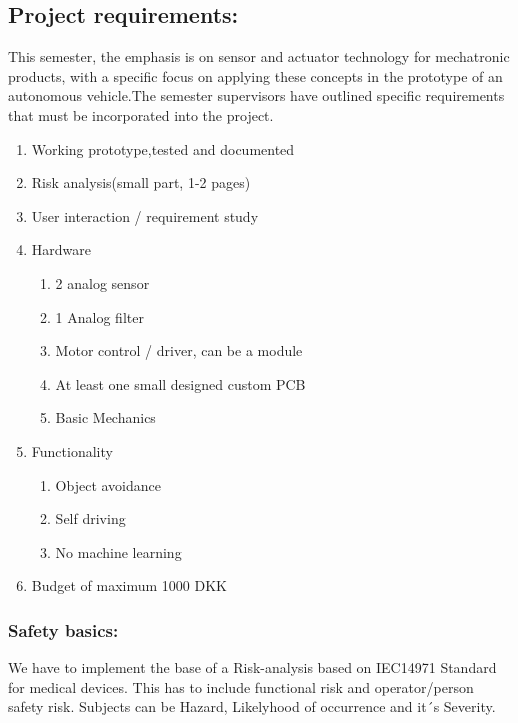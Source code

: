 \documentclass[../report.tex]{subfiles}
\begin{document}
\subsection{Project requirements:}
This semester, the emphasis is on sensor and actuator technology for
mechatronic products, with a specific focus on applying these concepts in the
prototype of an autonomous vehicle.The semester supervisors have outlined
specific requirements that must be incorporated into the project.
\begin{enumerate}
    \item Working prototype,tested and documented
    \item Risk analysis(small part, 1-2 pages)
    \item User interaction / requirement study
    \item Hardware\begin{enumerate}
        \item 2 analog sensor
        \item 1 Analog filter
        \item Motor control / driver, can be a module
        \item At least one small designed custom PCB
        \item Basic Mechanics
    \end{enumerate}
    \item Functionality\begin{enumerate}
        \item Object avoidance
        \item Self driving
        \item No machine learning
    \end{enumerate}
    \item Budget of maximum 1000 DKK
\end{enumerate}
\subsubsection{Safety basics:}
We have to implement the base of a Risk-analysis based on IEC14971 Standard for medical devices.
This has to include functional risk and operator/person safety risk. Subjects can be Hazard, Likelyhood
of occurrence and it´s Severity.
\end{document}
